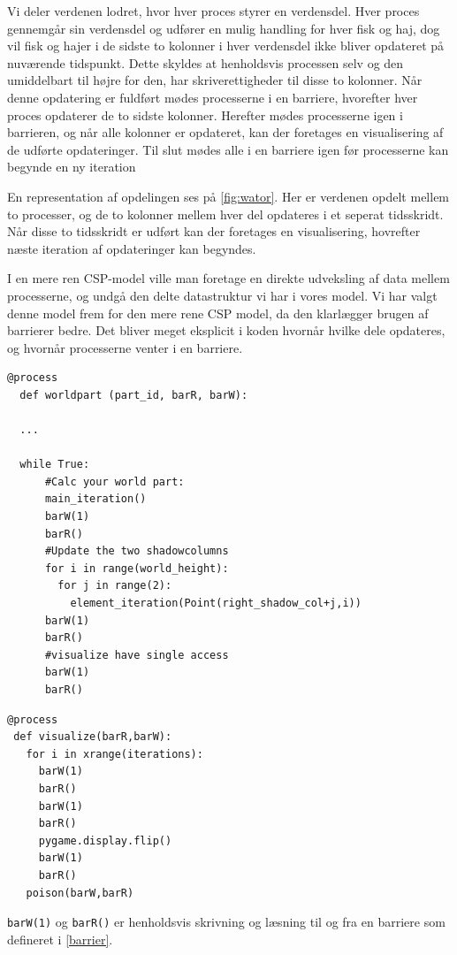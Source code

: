 Vi deler verdenen lodret, hvor hver proces styrer en verdensdel. Hver proces 
gennemgår sin verdensdel og udfører en mulig handling for hver fisk og haj, dog 
vil fisk og hajer i de sidste to kolonner i hver verdensdel ikke bliver 
opdateret på nuværende tidspunkt. Dette skyldes at henholdsvis processen selv 
og den umiddelbart til højre for den, har skriverettigheder til disse to 
kolonner.  Når denne opdatering er fuldført mødes processerne i en barriere, 
hvorefter hver proces opdaterer de to sidste kolonner. Herefter mødes 
processerne igen i barrieren, og når alle kolonner er opdateret, kan der 
foretages en visualisering af de udførte opdateringer. Til slut mødes alle i en 
barriere igen før processerne kan begynde en ny iteration 

En representation af opdelingen ses på \autoref{fig:wator}. Her er verdenen 
opdelt mellem to processer, og de to kolonner mellem hver del opdateres i et 
seperat tidsskridt. Når disse to tidsskridt er udført kan der foretages en 
visualisering, hovrefter næste iteration af opdateringer kan begyndes.  

I en mere ren CSP-model ville man foretage en direkte udveksling af data mellem 
processerne, og undgå den delte datastruktur vi har i vores model.  Vi har 
valgt denne model frem for den mere rene CSP model, da den klarlægger brugen af 
barrierer bedre.  Det bliver meget eksplicit i koden hvornår hvilke dele 
opdateres, og hvornår processerne venter i en barriere.

\noindent 
\begin{minipage}{\linewidth}
\begin{lstlisting}[label=wator-worldpart,caption=Uddrag af processen 
  \emph{worldpart} i Wator]
  @process
  def worldpart (part_id, barR, barW):
  
  ...
  
  while True:
      #Calc your world part:
      main_iteration()
      barW(1)
      barR()
      #Update the two shadowcolumns
      for i in range(world_height):
        for j in range(2):
          element_iteration(Point(right_shadow_col+j,i))
      barW(1)
      barR()
      #visualize have single access
      barW(1)
      barR()
\end{lstlisting}

\begin{lstlisting}[label=wator-visualize,caption=Processen \emph{visualize} i 
  Wator]
@process
 def visualize(barR,barW):
   for i in xrange(iterations):
     barW(1)
     barR()
     barW(1)
     barR()
     pygame.display.flip()
     barW(1)
     barR()
   poison(barW,barR)
\end{lstlisting}

\texttt{barW(1)} og \texttt{barR()} er henholdsvis skrivning og læsning til og 
fra en barriere som defineret i \vref{barrier}. 

\end{minipage}

